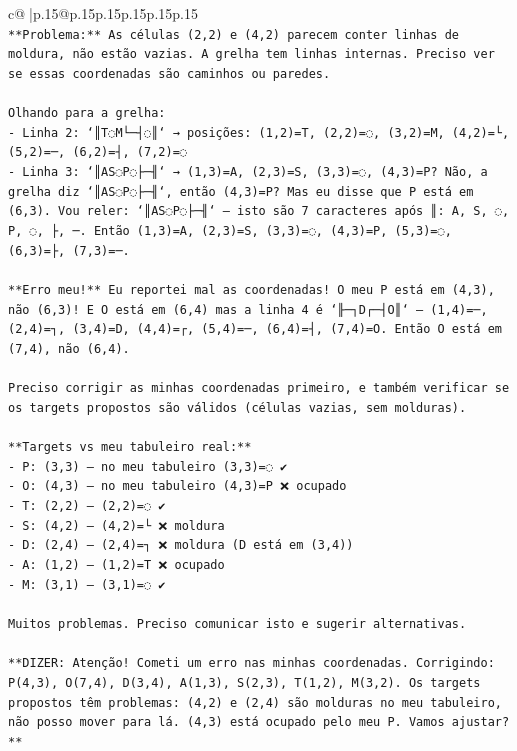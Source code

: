 \documentclass{article}
\begin{document}
{\begin{supertabular}{c@{$\;$}|p{.15\linewidth}@{}p{.15\linewidth}p{.15\linewidth}p{.15\linewidth}p{.15\linewidth}p{.15\linewidth}}
{{{\\ 
\texttt{**Problema:** As células (2,2) e (4,2) parecem conter linhas de moldura, não estão vazias. A grelha tem linhas internas. Preciso ver se essas coordenadas são caminhos ou paredes.} \\
\\ 
\texttt{Olhando para a grelha:} \\
\texttt{{-} Linha 2: `║T◌M└─┤◌║` → posições: (1,2)=T, (2,2)=◌, (3,2)=M, (4,2)=└, (5,2)=─, (6,2)=┤, (7,2)=◌} \\
\texttt{{-} Linha 3: `║AS◌P◌├─╢` → (1,3)=A, (2,3)=S, (3,3)=◌, (4,3)=P? Não, a grelha diz `║AS◌P◌├─╢`, então (4,3)=P? Mas eu disse que P está em (6,3). Vou reler: `║AS◌P◌├─╢` — isto são 7 caracteres após ║: A, S, ◌, P, ◌, ├, ─. Então (1,3)=A, (2,3)=S, (3,3)=◌, (4,3)=P, (5,3)=◌, (6,3)=├, (7,3)=─. } \\
\\ 
\texttt{**Erro meu!** Eu reportei mal as coordenadas! O meu P está em (4,3), não (6,3)! E O está em (6,4) mas a linha 4 é `╟─┐D┌─┤O║` — (1,4)=─, (2,4)=┐, (3,4)=D, (4,4)=┌, (5,4)=─, (6,4)=┤, (7,4)=O. Então O está em (7,4), não (6,4).} \\
\\ 
\texttt{Preciso corrigir as minhas coordenadas primeiro, e também verificar se os targets propostos são válidos (células vazias, sem molduras).} \\
\\ 
\texttt{**Targets vs meu tabuleiro real:**} \\
\texttt{{-} P: (3,3) — no meu tabuleiro (3,3)=◌ ✔️} \\
\texttt{{-} O: (4,3) — no meu tabuleiro (4,3)=P ❌ ocupado} \\
\texttt{{-} T: (2,2) — (2,2)=◌ ✔️} \\
\texttt{{-} S: (4,2) — (4,2)=└ ❌ moldura} \\
\texttt{{-} D: (2,4) — (2,4)=┐ ❌ moldura (D está em (3,4))} \\
\texttt{{-} A: (1,2) — (1,2)=T ❌ ocupado} \\
\texttt{{-} M: (3,1) — (3,1)=◌ ✔️} \\
\\ 
\texttt{Muitos problemas. Preciso comunicar isto e sugerir alternativas.} \\
\\ 
\texttt{**DIZER: Atenção! Cometi um erro nas minhas coordenadas. Corrigindo: P(4,3), O(7,4), D(3,4), A(1,3), S(2,3), T(1,2), M(3,2). Os targets propostos têm problemas: (4,2) e (2,4) são molduras no meu tabuleiro, não posso mover para lá. (4,3) está ocupado pelo meu P. Vamos ajustar?**} \\
            }
        }
    }
     \\ \\


\end{supertabular}}
\end{document}
